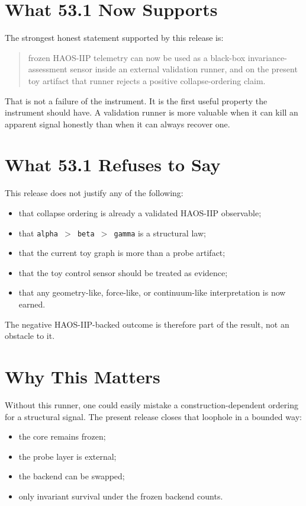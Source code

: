 \documentclass[11pt]{article}
\begin{document}
\section{What 53.1 Now Supports}

The strongest honest statement supported by this release is:

\begin{quote}
frozen HAOS-IIP telemetry can now be used as a black-box invariance-assessment sensor inside an external validation runner, and on the present toy artifact that runner rejects a positive collapse-ordering claim.
\end{quote}

That is not a failure of the instrument. It is the first useful property the instrument should have. A validation runner is more valuable when it can kill an apparent signal honestly than when it can always recover one.

\section{What 53.1 Refuses to Say}

This release does not justify any of the following:
\begin{itemize}
\item that collapse ordering is already a validated HAOS-IIP observable;
\item that \texttt{alpha $>$ beta $>$ gamma} is a structural law;
\item that the current toy graph is more than a probe artifact;
\item that the toy control sensor should be treated as evidence;
\item that any geometry-like, force-like, or continuum-like interpretation is now earned.
\end{itemize}

The negative HAOS-IIP-backed outcome is therefore part of the result, not an obstacle to it.

\section{Why This Matters}

Without this runner, one could easily mistake a construction-dependent ordering for a structural signal. The present release closes that loophole in a bounded way:
\begin{itemize}
\item the core remains frozen;
\item the probe layer is external;
\item the backend can be swapped;
\item only invariant survival under the frozen backend counts.
\end{itemize}
\end{document}
